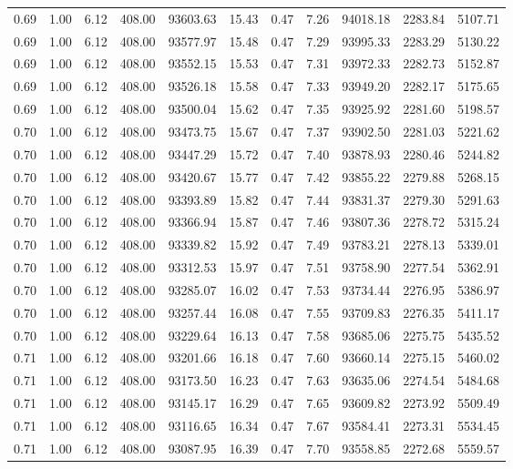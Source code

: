 \begin{table}[!ht]
\begin{tabular}{rrrrrrrrrrr}
0.69 & 1.00 & 6.12 & 408.00 & 93603.63 & 15.43 & 0.47 & 7.26 & 94018.18 & 2283.84 & 5107.71 \\
0.69 & 1.00 & 6.12 & 408.00 & 93577.97 & 15.48 & 0.47 & 7.29 & 93995.33 & 2283.29 & 5130.22 \\
0.69 & 1.00 & 6.12 & 408.00 & 93552.15 & 15.53 & 0.47 & 7.31 & 93972.33 & 2282.73 & 5152.87 \\
0.69 & 1.00 & 6.12 & 408.00 & 93526.18 & 15.58 & 0.47 & 7.33 & 93949.20 & 2282.17 & 5175.65 \\
0.69 & 1.00 & 6.12 & 408.00 & 93500.04 & 15.62 & 0.47 & 7.35 & 93925.92 & 2281.60 & 5198.57 \\
0.70 & 1.00 & 6.12 & 408.00 & 93473.75 & 15.67 & 0.47 & 7.37 & 93902.50 & 2281.03 & 5221.62 \\
0.70 & 1.00 & 6.12 & 408.00 & 93447.29 & 15.72 & 0.47 & 7.40 & 93878.93 & 2280.46 & 5244.82 \\
0.70 & 1.00 & 6.12 & 408.00 & 93420.67 & 15.77 & 0.47 & 7.42 & 93855.22 & 2279.88 & 5268.15 \\
0.70 & 1.00 & 6.12 & 408.00 & 93393.89 & 15.82 & 0.47 & 7.44 & 93831.37 & 2279.30 & 5291.63 \\
0.70 & 1.00 & 6.12 & 408.00 & 93366.94 & 15.87 & 0.47 & 7.46 & 93807.36 & 2278.72 & 5315.24 \\
0.70 & 1.00 & 6.12 & 408.00 & 93339.82 & 15.92 & 0.47 & 7.49 & 93783.21 & 2278.13 & 5339.01 \\
0.70 & 1.00 & 6.12 & 408.00 & 93312.53 & 15.97 & 0.47 & 7.51 & 93758.90 & 2277.54 & 5362.91 \\
0.70 & 1.00 & 6.12 & 408.00 & 93285.07 & 16.02 & 0.47 & 7.53 & 93734.44 & 2276.95 & 5386.97 \\
0.70 & 1.00 & 6.12 & 408.00 & 93257.44 & 16.08 & 0.47 & 7.55 & 93709.83 & 2276.35 & 5411.17 \\
0.70 & 1.00 & 6.12 & 408.00 & 93229.64 & 16.13 & 0.47 & 7.58 & 93685.06 & 2275.75 & 5435.52 \\
0.71 & 1.00 & 6.12 & 408.00 & 93201.66 & 16.18 & 0.47 & 7.60 & 93660.14 & 2275.15 & 5460.02 \\
0.71 & 1.00 & 6.12 & 408.00 & 93173.50 & 16.23 & 0.47 & 7.63 & 93635.06 & 2274.54 & 5484.68 \\
0.71 & 1.00 & 6.12 & 408.00 & 93145.17 & 16.29 & 0.47 & 7.65 & 93609.82 & 2273.92 & 5509.49 \\
0.71 & 1.00 & 6.12 & 408.00 & 93116.65 & 16.34 & 0.47 & 7.67 & 93584.41 & 2273.31 & 5534.45 \\
0.71 & 1.00 & 6.12 & 408.00 & 93087.95 & 16.39 & 0.47 & 7.70 & 93558.85 & 2272.68 & 5559.57 \\

\end{tabular}
\end{table}
